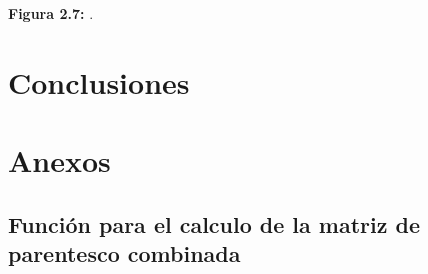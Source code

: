 \documentclass[11pt,spanish,a4paper,oneside,]{book} %
\begin{document}
\begin{center}
\textbf{Figura 2.7:} .

\end{center}

\hypertarget{conclusiones}{%
\chapter{Conclusiones}\label{conclusiones}}

\hypertarget{appendix-appendix}{%
\appendix}


\hypertarget{anexos}{%
\chapter{Anexos}\label{anexos}}

\hypertarget{funciuxf3n-para-el-calculo-de-la-matriz-de-parentesco-combinada}{%
\section{Función para el calculo de la matriz de parentesco combinada}\label{funciuxf3n-para-el-calculo-de-la-matriz-de-parentesco-combinada}}
\end{document}
